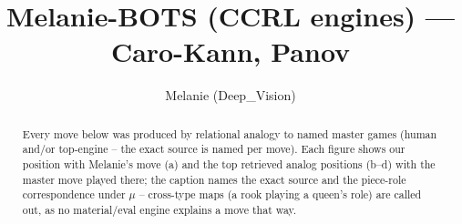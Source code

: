 \documentclass[11pt]{article}
\title{Melanie-BOTS (CCRL engines) — Caro-Kann, Panov}
\author{Melanie (Deep\_Vision)}
\date{}
\begin{document}
\maketitle

\begin{abstract}Every move below was produced by relational analogy to named master games (human and/or top-engine -- the exact source is named per move). Each figure shows our position with Melanie's move (a) and the top retrieved analog positions (b--d) with the master move played there; the caption names the exact source and the piece-role correspondence under $\mu$ -- cross-type maps (a rook playing a queen's role) are called out, as no material/eval engine explains a move that way.\end{abstract}

\begin{figure}[p]\centering
\begin{subfigure}{0.46\textwidth}\centering
\resizebox{\linewidth}{!}{%
\newchessgame
\chessboard[
  setfen={rnbqk1r1/pp2bppp/4pn2/3P2N1/3P4/2N5/PP3PPP/R1BQKB1R b KQq - 0 8},
  showmover=false,
  pgfstyle=straightmove, color=movearrow, markmove={e6-d5}
]}
\caption{}
\end{subfigure}\hfill
\begin{subfigure}{0.46\textwidth}\centering
\resizebox{\linewidth}{!}{%
\newchessgame
\chessboard[
  setfen={r1bqkb1r/pp3ppp/2n1p3/3n4/3p4/2NBPN2/PP3PPP/R1BQK2R w KQkq - 0 8},
  showmover=false,
  pgfstyle=straightmove, color=movearrow, markmove={e3-d4}
]}
\caption{}
\end{subfigure}
\\[4pt]
\begin{subfigure}{0.46\textwidth}\centering
\resizebox{\linewidth}{!}{%
\newchessgame
\chessboard[
  setfen={r1bqkb1r/pp3ppp/2n1p3/3n4/3p4/2NBPN2/PP3PPP/R1BQK2R w KQkq - 0 8},
  showmover=false,
  pgfstyle=straightmove, color=movearrow, markmove={e3-d4}
]}
\caption{}
\end{subfigure}\hfill
\begin{subfigure}{0.46\textwidth}\centering
\resizebox{\linewidth}{!}{%
\newchessgame
\chessboard[
  setfen={r1bqkbnr/pp4pp/2n1p3/3pN3/3p4/2P5/PP2BPPP/RNBQK2R w KQkq - 0 8},
  showmover=false,
  pgfstyle=straightmove, color=movearrow, markmove={e5-c6}
]}
\caption{}
\end{subfigure}

\end{figure}
\end{document}
